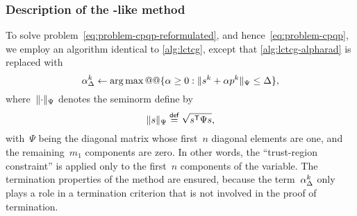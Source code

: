 \subsubsection{Description of the -like method}

To solve problem~\cref{eq:problem-cpqp-reformulated}, and hence~\cref{eq:problem-cpqp}, we employ an algorithm identical to \cref{alg:lctcg}, except that \cref{alg:lctcg-alpharad} is replaced with
\begin{equation*}
    \alpha_{\rad}^k \gets \argmax @@ \set{\alpha \ge 0 : \norm{\sstep[k] + \alpha \pstep[k]}_{\Psi} \le \rad},
\end{equation*}
where~$\lVert\cdot\rVert_{\Psi}$ denotes the seminorm define by
\begin{equation*}
    \norm{\sstep}_{\Psi} \eqdef \sqrt{\sstep^{\T} \Psi \sstep},
\end{equation*}
with~$\Psi$ being the diagonal matrix whose first~$n$ diagonal elements are one, and the remaining~$m_1$ components are zero.
In other words, the \enquote{trust-region constraint} is applied only to the first~$n$ components of the variable.
The termination properties of the method are ensured, because the term~$\alpha_{\rad}^k$ only plays a role in a termination criterion that is not involved in the proof of termination.



